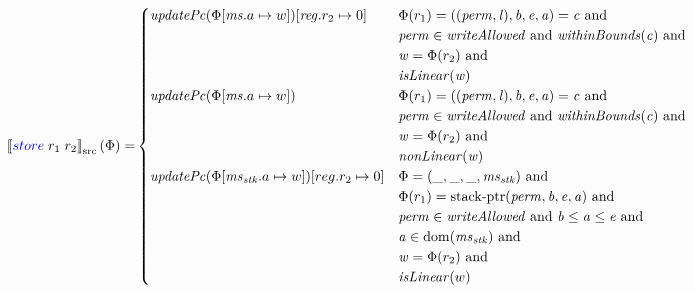 \documentclass[a4paper]{article}
\newcommand{\sem}[1]{\left\llbracket #1 \right\rrbracket}
\newcommand{\ssem}[2][\Phi]{\sem{#2}_{\mathrm{src}}(#1)}
\newcommand{\dom}{\mathrm{dom}}
\newcommand{\tand}{\text{ and }}
\newcommand{\sourcecolor}[1]{\color{blue}}
\newcommand{\src}[1]{{\sourcecolor{} #1}}
\newcommand{\zinstr}[1]{#1}
\newcommand{\twoinstr}[3]{
  \ifthenelse{\equal{#2#3}{}}
  {\zinstr{#1}}
  {\zinstr{#1} \; #2 \; #3}
}
\newcommand{\sstore}[2]{\twoinstr{\src{store}}{#1}{#2}}
\newcommand{\update}[2]{[#1 \mapsto #2]}
\newcommand{\perm}{\var{perm}}
\newcommand{\lin}{\var{l}}
\newcommand{\stkptr}[1]{\mathrm{stack\text{-}ptr}(#1)}
\newcommand{\var}[1]{\mathit{#1}}
\newcommand{\reg}{\var{reg}}
\newcommand{\ms}{\var{ms}}
\newcommand{\stk}{\var{stk}}
\newcommand{\baddr}{\var{b}}
\newcommand{\eaddr}{\var{e}}
\newcommand{\aaddr}{\var{a}}
\newcommand{\plainfun}[2]{
  \ifthenelse{\equal{#2}{}}
  {\mathit{#1}}
  {\mathit{#1}(#2)}
}
\newcommand{\updPcAddr}[1]{\plainfun{updatePc}{#1}}
\newcommand{\writeAllowed}[1]{\plainfun{writeAllowed}{#1}}
\newcommand{\nonLinear}[1]{\plainfun{nonLinear}{#1}}
\newcommand{\isLinear}[1]{\plainfun{isLinear}{#1}}
\newcommand{\withinBounds}[1]{\plainfun{withinBounds}{#1}}
\begin{document}
\begin{align*}
  \ssem{\sstore{r_1}{r_2}} = & 
                               \begin{cases}
                                 \updPcAddr{\Phi\update{\ms.a}{w}}\update{\reg.r_2}{0} &
                                 \arraycolsep=0pt
                                 \begin{array}[t]{l}
                                   \Phi(r_1) = ((\perm,\lin),\baddr,\eaddr,\aaddr) = \var{c} \tand\\
                                   \perm \in \writeAllowed{} \tand \withinBounds{\var{c}} \tand \\
                                   \var{w} = \Phi(r_2) \tand \\
                                   \isLinear{\var{w}}
                                 \end{array} \\
                                 \updPcAddr{\Phi\update{\ms.a}{w}} &
                                 \arraycolsep=0pt
                                 \begin{array}[t]{l}
                                   \Phi(r_1) = ((\perm,\lin),\baddr,\eaddr,\aaddr) = \var{c} \tand\\
                                   \perm \in \writeAllowed{} \tand \withinBounds{\var{c}} \tand \\
                                   \var{w} = \Phi(r_2) \tand \\
                                   \nonLinear{\var{w}}
                                 \end{array} \\
%
                                 \updPcAddr{\Phi\update{\ms_\stk.a}{w}}\update{reg.r_2}{0} & 
                                 \arraycolsep=0pt
                                 \begin{array}[t]{l}
                                   \Phi = (\_, \_, \_, \ms_\stk) \tand \\
                                   \Phi(r_1) = \stkptr{\perm,\baddr,\eaddr,\aaddr} \tand \\
                                   \perm \in \writeAllowed{} \tand \baddr \leq \aaddr \leq \eaddr \tand \\
                                   \aaddr \in \dom(\ms_\stk) \tand \\
                                   \var{w} = \Phi(r_2) \tand \\
                                   \isLinear{w} 

\end{array}
\end{cases}
\end{align*}
\end{document}
